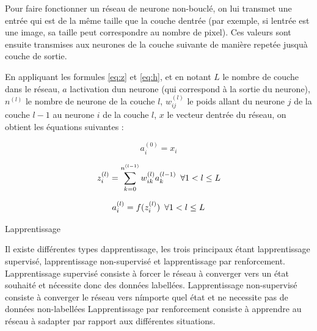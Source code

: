 \documentclass[11pt]{sdm}
\begin{document}
			Pour faire fonctionner un r\'eseau de neurone non-boucl\'e, on lui transmet une entr\'ee qui est de la m\^eme taille que la couche d\textquotesingle entr\'ee (par exemple, si l\textquotesingle entr\'ee est une image, sa taille peut correspondre au nombre de pixel). Ces valeurs sont ensuite transmises aux neurones de la couche suivante de mani\`ere repet\'ee jusqu\textquotesingle \`a couche de sortie.

			En appliquant les formules \ref{eq:z} et \ref{eq:h}, et en notant $L$ le nombre de couche dans le r\'eseau, $a$ l\textquotesingle activation d\textquotesingle un neurone (qui correspond \`a la sortie du neurone), $n^{(l)}$ le nombre de neurone de la couche $l$, $w_{ij}^{(l)}$ le poids allant du neurone $j$ de la couche $l-1$ au neurone $i$ de la couche $l$, $x$ le vecteur d\textquotesingle entr\'ee du r\'eseau, on obtient les \'equations suivantes :

			\begin{equation}
				a_i^{(0)} = x_i
				\label{eq:input}
			\end{equation}

			\begin{equation}
				z_i^{(l)} = \sum_{k=0}^{n^{(l-1)}} w_{ik}^{(l)} a_k^{(l-1)} \enskip \forall 1 < l \leq L
				\label{eq:zGlobal}
			\end{equation}

			\begin{equation}
				a_i^{(l)} = f(z_i^{(l)}) \enskip \forall 1 < l \leq L
				\label{eq:activation}
			\end{equation}

			\medbreak
			\begin{itshape}L\textquotesingle apprentissage\end{itshape}
			\smallbreak
			Il existe diff\'erentes types d\textquotesingle apprentissage, les trois principaux \'etant l\textquotesingle apprentissage supervis\'e, l\textquotesingle apprentissage non-supervis\'e et l\textquotesingle apprentissage par renforcement.
			L\textquotesingle apprentissage supervis\'e consiste \`a forcer le r\'eseau \`a converger vers un \'etat souhait\'e et n\'ecessite donc des donn\'ees labell\'ees.
			L\textquotesingle apprentissage non-supervis\'e consiste \`a converger le r\'eseau vers n\'importe quel \'etat et ne necessite pas de donn\'ees non-labell\'ees
			L\textquotesingle apprentissage par renforcement consiste \`a apprendre au r\'eseau \`a s\textquotesingle adapter par rapport aux diff\'erentes situations. 
			
\end{document}
